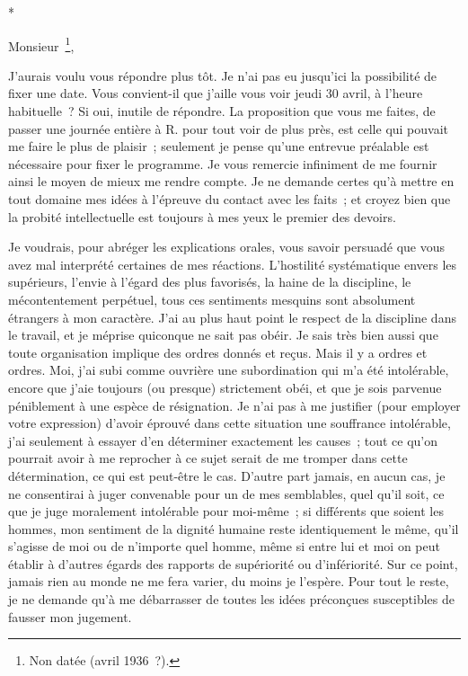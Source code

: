 \documentclass[french,twoside]{book} %
\begin{document}
\begin{center}
*\end{center}
\noindent Monsieur \footnote{Non datée (avril 1936 ?).},\par
J'aurais voulu vous répondre plus tôt. Je n'ai pas eu jusqu'ici la possibilité de fixer une date. Vous convient-il que j'aille vous voir jeudi 30 avril, à l'heure habituelle ? Si oui, inutile de répondre. La proposition que vous me faites, de passer une journée entière à R. pour tout voir de plus près, est celle qui pouvait me faire le plus de plaisir ; seulement je pense qu'une entrevue préalable est nécessaire pour fixer le programme. Je vous remercie infiniment de me fournir ainsi le moyen de mieux me rendre compte. Je ne demande certes qu'à mettre en tout domaine mes idées à l'épreuve du contact avec les faits ; et croyez bien que la probité intellectuelle est toujours à mes yeux le premier des devoirs.\par
Je voudrais, pour abréger les explications orales, vous savoir persuadé que vous avez mal interprété certaines de mes réactions. L'hostilité systématique envers les supérieurs, l'envie à l'égard des plus favorisés, la haine de la discipline, le mécontentement perpétuel, tous ces sentiments mesquins sont absolument étrangers à mon caractère. J'ai au plus haut point le respect de la discipline dans le travail, et je méprise quiconque ne sait pas obéir. Je sais très bien aussi que toute organisation implique des ordres donnés et reçus. Mais il y a ordres et ordres. Moi, j'ai subi comme ouvrière une subordination qui m'a été intolérable, encore que j'aie toujours (ou presque) strictement obéi, et que je sois parvenue péniblement à une espèce de résignation. Je n'ai pas à me justifier (pour employer votre expression) d'avoir éprouvé dans cette situation une souffrance intolérable, j'ai seulement à essayer d'en déterminer exactement les causes ; tout ce qu'on pourrait avoir à me reprocher à ce sujet serait de me tromper dans cette détermination, ce qui est peut-être le cas. D'autre part jamais, en aucun cas, je ne consentirai à juger convenable pour un de mes semblables, quel qu'il soit, ce que je juge moralement intolérable pour moi-même ; si différents que soient les hommes, mon sentiment de la dignité humaine reste identiquement le même, qu'il s'agisse de moi ou de n'importe quel homme, même si entre lui et moi on peut établir à d'autres égards des rapports de supériorité ou d'infériorité. Sur ce point, jamais rien au monde ne me fera varier, du moins je l'espère. Pour tout le reste, je ne demande qu'à me débarrasser de toutes les idées préconçues susceptibles de fausser mon jugement.\par
\end{document}
